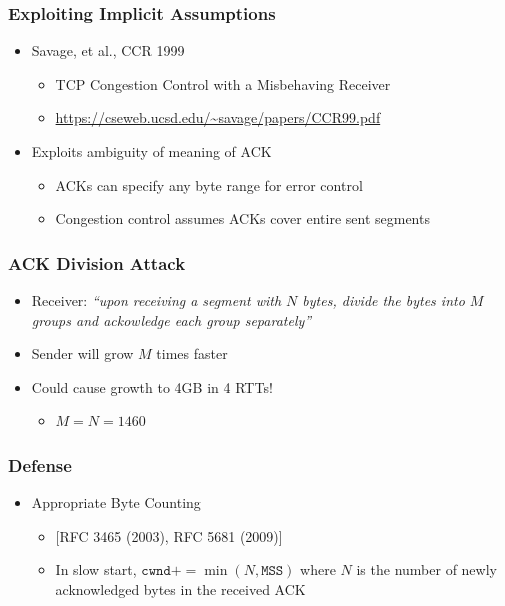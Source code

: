 \subsubsection{Exploiting Implicit Assumptions}
\begin{itemize}[nosep]
    \item Savage, et al., CCR 1999
          \begin{itemize}[nosep]
              \item TCP Congestion Control with a Misbehaving Receiver
              \item \url{https://cseweb.ucsd.edu/~savage/papers/CCR99.pdf}
          \end{itemize}
    \item Exploits ambiguity of meaning of ACK
          \begin{itemize}[nosep]
              \item ACKs can specify any byte range for error control
              \item Congestion control assumes ACKs cover entire sent segments
          \end{itemize}
\end{itemize}
\subsubsection{ACK Division Attack}
\begin{itemize}[nosep]
    \item Receiver: \textit{``upon receiving a segment with $N$ bytes, divide the bytes into $M$ groups and ackowledge each group separately''}
    \item Sender will grow $M$ times faster
    \item Could cause growth to 4GB in 4 RTTs!
          \begin{itemize}[nosep]
              \item $M = N = 1460$
          \end{itemize}
\end{itemize}
\subsubsection{Defense}
\begin{itemize}[nosep]
    \item Appropriate Byte Counting
          \begin{itemize}[nosep]
              \item \phantom{}[RFC 3465 (2003), RFC 5681 (2009)]
              \item In slow start, $\texttt{cwnd} += \min(N, \texttt{MSS})$ where $N$ is the number of newly acknowledged bytes in the received ACK
          \end{itemize}
\end{itemize}
